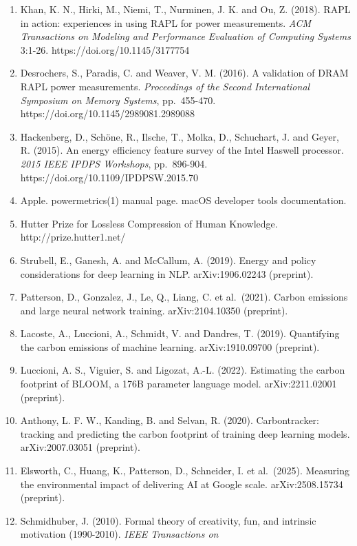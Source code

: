 \documentclass[
  10pt,
]{article}
\begin{document}
\begin{enumerate}
  12:241655. https://doi.org/10.1098/rsos.241655
\item
  Khan, K. N., Hirki, M., Niemi, T., Nurminen, J. K. and Ou, Z. (2018).
  RAPL in action: experiences in using RAPL for power measurements.
  \emph{ACM Transactions on Modeling and Performance Evaluation of
  Computing Systems} 3:1-26. https://doi.org/10.1145/3177754
\item
  Desrochers, S., Paradis, C. and Weaver, V. M. (2016). A validation of
  DRAM RAPL power measurements. \emph{Proceedings of the Second
  International Symposium on Memory Systems}, pp.~455-470.
  https://doi.org/10.1145/2989081.2989088
\item
  Hackenberg, D., Schöne, R., Ilsche, T., Molka, D., Schuchart, J. and
  Geyer, R. (2015). An energy efficiency feature survey of the Intel
  Haswell processor. \emph{2015 IEEE IPDPS Workshops}, pp.~896-904.
  https://doi.org/10.1109/IPDPSW.2015.70
\item
  Apple. powermetrics(1) manual page. macOS developer tools
  documentation.
\item
  Hutter Prize for Lossless Compression of Human Knowledge.
  http://prize.hutter1.net/
\item
  Strubell, E., Ganesh, A. and McCallum, A. (2019). Energy and policy
  considerations for deep learning in NLP. arXiv:1906.02243 (preprint).
\item
  Patterson, D., Gonzalez, J., Le, Q., Liang, C. et al.~(2021). Carbon
  emissions and large neural network training. arXiv:2104.10350
  (preprint).
\item
  Lacoste, A., Luccioni, A., Schmidt, V. and Dandres, T. (2019).
  Quantifying the carbon emissions of machine learning. arXiv:1910.09700
  (preprint).
\item
  Luccioni, A. S., Viguier, S. and Ligozat, A.-L. (2022). Estimating the
  carbon footprint of BLOOM, a 176B parameter language model.
  arXiv:2211.02001 (preprint).
\item
  Anthony, L. F. W., Kanding, B. and Selvan, R. (2020). Carbontracker:
  tracking and predicting the carbon footprint of training deep learning
  models. arXiv:2007.03051 (preprint).
\item
  Elsworth, C., Huang, K., Patterson, D., Schneider, I. et al.~(2025).
  Measuring the environmental impact of delivering AI at Google scale.
  arXiv:2508.15734 (preprint).
\item
  Schmidhuber, J. (2010). Formal theory of creativity, fun, and
  intrinsic motivation (1990-2010). \emph{IEEE Transactions on
}
\end{enumerate}
\end{document}
